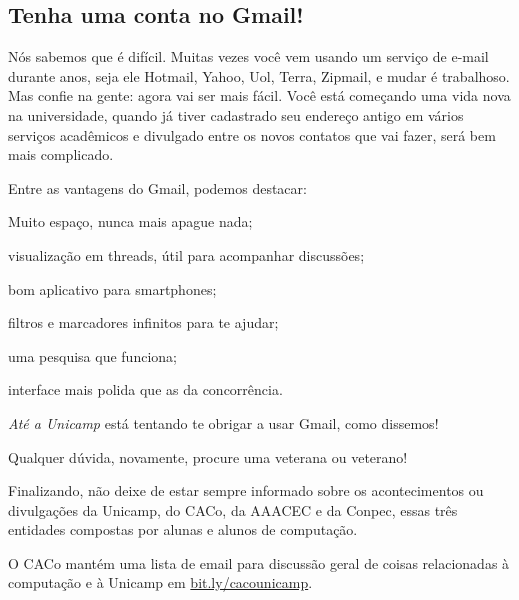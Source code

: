 \subsection{Tenha uma conta no Gmail!}

Nós sabemos que é difícil. Muitas vezes você vem usando um serviço de e-mail
durante anos, seja ele Hotmail, Yahoo, Uol, Terra, Zipmail, e mudar é
trabalhoso. Mas confie na gente: agora vai ser mais fácil. Você está começando
uma vida nova na universidade, quando já tiver cadastrado seu endereço antigo
em vários serviços acadêmicos e divulgado entre os novos contatos que vai
fazer, será bem mais complicado.

Entre as vantagens do Gmail, podemos destacar:

\begin{compactitemize}
\item Muito espaço, nunca mais apague nada;
\item visualização em threads, útil para acompanhar discussões;
\item bom aplicativo para smartphones;
\item filtros e marcadores infinitos para te ajudar;
\item uma pesquisa que funciona;
\item interface mais polida que as da concorrência.
\end{compactitemize}

\emph{Até a Unicamp} está tentando te obrigar a usar Gmail, como dissemos!
\shrug

Qualquer dúvida, novamente, procure uma veterana ou veterano!

Finalizando, não deixe de estar sempre informado sobre os acontecimentos ou
divulgações da Unicamp, do CACo, da AAACEC e da Conpec, essas três entidades
compostas por alunas e alunos de computação.

O CACo mantém uma lista de email para discussão geral de coisas relacionadas à
computação e à Unicamp em \url{bit.ly/cacounicamp}.
